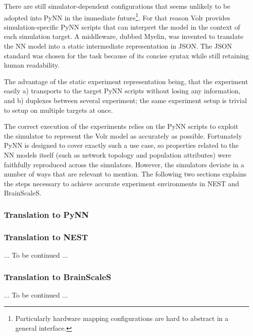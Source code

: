 There are still simulator-dependent configurations that seems unlikely to be
adopted into PyNN in the immediate future\footnote{
  Particularly hardware mapping configurations are hard to abstract in a general
  interface.
}.
For that reason Volr provides simulation-specific PyNN scripts that can
interpret the model in the context of each simulation target.
A middleware, dubbed \gls{Myelin}, was invented to translate the \gls{NN} model
into a static intermediate representation in JSON.
The JSON standard was chosen for the task because of its concise syntax while
still retaining human readability.

The advantage of the static experiment representation being, that the experiment
easily a) transports to the target PyNN scripts without losing any information,
and b) duplexes between several experiment; the same experiment setup is
trivial to setup on multiple targets at once.

The correct execution of the experiments relies on the PyNN scripts to exploit
the simulator to represent the Volr model as accurately as possible.
Fortunately PyNN is designed to cover exactly such a use case, so properties
related to the \gls{NN} models itself (such as network topology and population
attributes) were faithfully reproduced across the simulators.
However, the simulators deviate in a number of ways that are relevant to
mention.
The following two sections explains the steps necessary to achieve accurate
experiment environments in \gls{NEST} and \gls{BrainScaleS}.

\subsubsection{Translation to PyNN} \label{sec:volr-translation}

\subsubsection{Translation to NEST} \label{sec:volr-NEST}
... To be continued ...
\subsubsection{Translation to BrainScaleS} \label{sec:volr-BrainScaleS}
... To be continued ...
